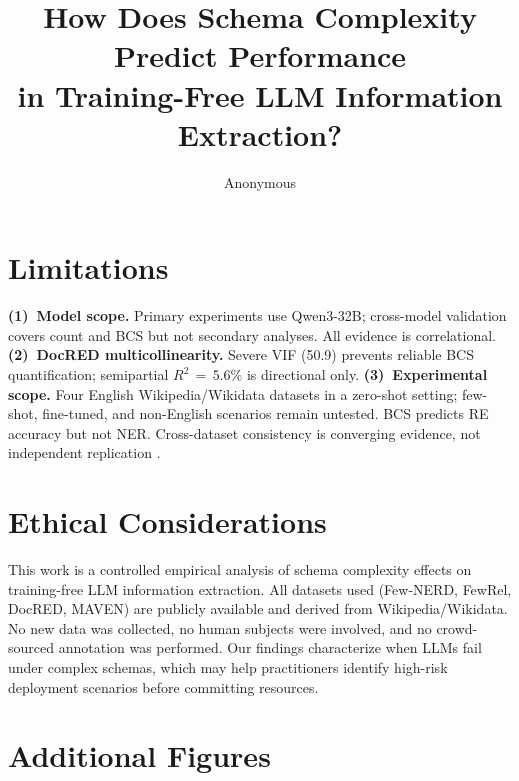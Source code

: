 \documentclass[11pt]{article}
\title{How Does Schema Complexity Predict Performance\\in Training-Free LLM Information Extraction?}
\author{Anonymous}
\begin{document}
\maketitle















\section*{Limitations}
\textbf{(1)~Model scope.}
Primary experiments use Qwen3-32B; cross-model validation covers count and BCS but not secondary analyses. All evidence is correlational.
\textbf{(2)~DocRED multicollinearity.}
Severe VIF (50.9) prevents reliable BCS quantification; semipartial $R^2{}\,=\,5.6\%$ is directional only.
\textbf{(3)~Experimental scope.}
Four English Wikipedia/Wikidata datasets in a zero-shot setting; few-shot, fine-tuned, and non-English scenarios remain untested. BCS predicts RE accuracy but not NER. Cross-dataset consistency is converging evidence, not independent replication \citep{rothman-1990}.

\section*{Ethical Considerations}
This work is a controlled empirical analysis of schema complexity effects on training-free LLM information extraction. All datasets used (Few-NERD, FewRel, DocRED, MAVEN) are publicly available and derived from Wikipedia/Wikidata. No new data was collected, no human subjects were involved, and no crowd-sourced annotation was performed. Our findings characterize when LLMs fail under complex schemas, which may help practitioners identify high-risk deployment scenarios before committing resources.




\appendix

\section{Additional Figures}
\label{sec:appendix_figures}
\end{document}
